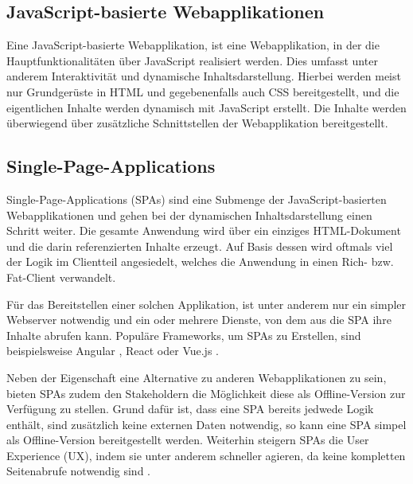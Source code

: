 


\subsection{JavaScript-basierte Webapplikationen}

Eine JavaScript-basierte Webapplikation, ist eine Webapplikation, in der die Hauptfunktionalitäten über JavaScript realisiert werden. Dies umfasst unter anderem Interaktivität und dynamische Inhaltsdarstellung. Hierbei werden meist nur Grundgerüste in HTML und gegebenenfalls auch CSS bereitgestellt, und die eigentlichen Inhalte werden dynamisch mit JavaScript erstellt. Die Inhalte werden überwiegend über zusätzliche Schnittstellen der Webapplikation bereitgestellt.

\subsection{Single-Page-Applications}
\label{subsec:singe-page-applications}

Single-Page-Applications (SPAs) sind eine Submenge der JavaScript-basierten Webapplikationen und gehen bei der dynamischen Inhaltsdarstellung einen Schritt weiter. Die gesamte Anwendung wird über ein einziges HTML-Dokument und die darin referenzierten Inhalte erzeugt. Auf Basis dessen wird oftmals viel der Logik im Clientteil angesiedelt, welches die Anwendung in einen Rich- bzw. Fat-Client verwandelt.

Für das Bereitstellen einer solchen Applikation, ist unter anderem nur ein simpler Webserver notwendig und ein oder mehrere Dienste, von dem aus die SPA ihre Inhalte abrufen kann. Populäre Frameworks, um SPAs zu Erstellen, sind beispielsweise Angular \cite{AngularHomepage}, React \cite{ReactHomepage} oder Vue.js \cite{VueJSHomepage}.

Neben der Eigenschaft eine Alternative zu anderen Webapplikationen zu sein, bieten SPAs zudem den Stakeholdern die Möglichkeit diese als Offline-Version zur Verfügung zu stellen. Grund dafür ist, dass eine SPA bereits jedwede Logik enthält, sind zusätzlich keine externen Daten notwendig, so kann eine SPA simpel als Offline-Version bereitgestellt werden. Weiterhin steigern SPAs die User Experience (UX), indem sie unter anderem schneller agieren, da keine kompletten Seitenabrufe notwendig sind \cite{ImprovementOfAcedemicServiceBasedOnSPA}.

